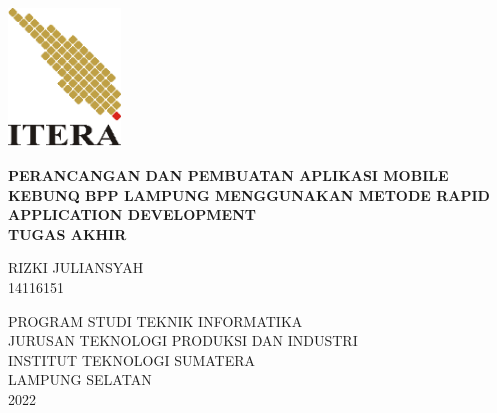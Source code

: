 \begin{center}


	\includegraphics[width=3cm]{images/logo-itera.png}

	\vspace{1cm}

	\onehalfspacing
	\large \bfseries PERANCANGAN DAN PEMBUATAN APLIKASI MOBILE KEBUNQ BPP LAMPUNG MENGGUNAKAN METODE RAPID APPLICATION DEVELOPMENT \\
	\vspace{3cm}
	 \large TUGAS AKHIR \\
	 
	\vspace{2cm}
	
	
	\vspace{1cm}
	\large
	RIZKI JULIANSYAH \\
	14116151
	
	\vspace{3cm}
	
	\large PROGRAM STUDI TEKNIK INFORMATIKA \\
	JURUSAN TEKNOLOGI PRODUKSI DAN INDUSTRI \\
	INSTITUT TEKNOLOGI SUMATERA \\
	LAMPUNG SELATAN \\
	2022
	

	
\end{center}

\newpage